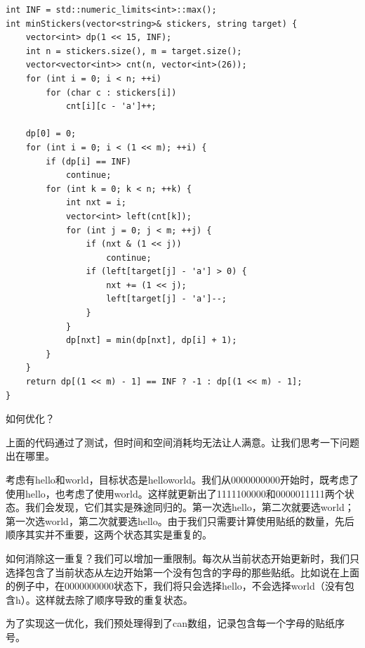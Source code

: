 \documentclass[9pt, b5paper]{article}
\begin{document}
\begin{verbatim}
int INF = std::numeric_limits<int>::max();
int minStickers(vector<string>& stickers, string target) {
    vector<int> dp(1 << 15, INF);
    int n = stickers.size(), m = target.size();
    vector<vector<int>> cnt(n, vector<int>(26));
    for (int i = 0; i < n; ++i)
        for (char c : stickers[i])
            cnt[i][c - 'a']++;

    dp[0] = 0;
    for (int i = 0; i < (1 << m); ++i) {
        if (dp[i] == INF)
            continue;
        for (int k = 0; k < n; ++k) {
            int nxt = i;
            vector<int> left(cnt[k]);
            for (int j = 0; j < m; ++j) {
                if (nxt & (1 << j))
                    continue;
                if (left[target[j] - 'a'] > 0) {
                    nxt += (1 << j);
                    left[target[j] - 'a']--;
                }
            }
            dp[nxt] = min(dp[nxt], dp[i] + 1);
        }
    }
    return dp[(1 << m) - 1] == INF ? -1 : dp[(1 << m) - 1];
}
\end{verbatim}

如何优化？

上面的代码通过了测试，但时间和空间消耗均无法让人满意。让我们思考一下问题出在哪里。

考虑有hello和world，目标状态是helloworld。我们从0000000000开始时，既考虑了使用hello，也考虑了使用world。这样就更新出了1111100000和0000011111两个状态。我们会发现，它们其实是殊途同归的。第一次选hello，第二次就要选world；第一次选world，第二次就要选hello。由于我们只需要计算使用贴纸的数量，先后顺序其实并不重要，这两个状态其实是重复的。

如何消除这一重复？我们可以增加一重限制。每次从当前状态开始更新时，我们只选择包含了当前状态从左边开始第一个没有包含的字母的那些贴纸。比如说在上面的例子中，在0000000000状态下，我们将只会选择hello，不会选择world（没有包含h）。这样就去除了顺序导致的重复状态。

为了实现这一优化，我们预处理得到了can数组，记录包含每一个字母的贴纸序号。
\end{document}
